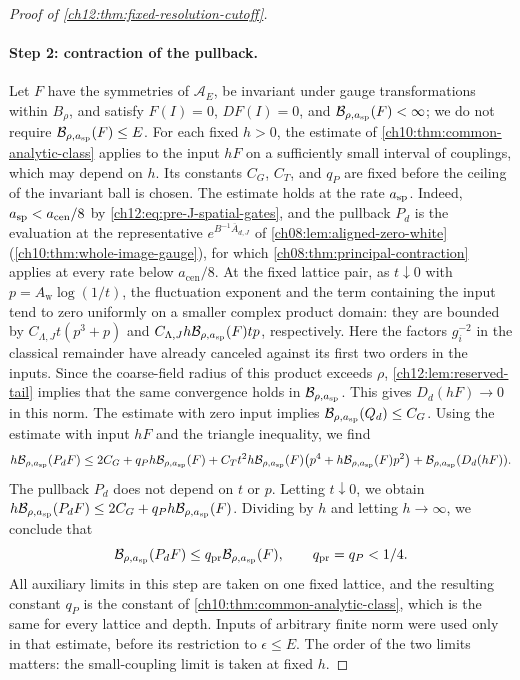 \begin{proof}[Proof of \cref{ch12:thm:fixed-resolution-cutoff}]
\paragraph{Step 2: contraction of the pullback.}
Let $F$ have the symmetries of $\mathcal A_E$, be invariant under gauge transformations within $B_\rho$, and satisfy $F(I)=0$, $DF(I)=0$, and $\mathcal B_{\rho,a_{\mathrm{sp}}}(F)<\infty$; we do not require $\mathcal B_{\rho,a_{\mathrm{sp}}}(F)\le E$. For each fixed $h>0$, the estimate of \cref{ch10:thm:common-analytic-class} applies to the input $hF$ on a sufficiently small interval of couplings, which may depend on $h$. Its constants $C_G$, $C_T$, and $q_P$ are fixed before the ceiling of the invariant ball is chosen. The estimate holds at the rate $a_{\mathrm{sp}}$. Indeed, $a_{\mathrm{sp}}<a_{\mathrm{cen}}/8$ by \eqref{ch12:eq:pre-J-spatial-gates}, and the pullback $P_d$ is the evaluation at the representative $e^{B^{-1}\overline A_{d,J}}$ of \cref{ch08:lem:aligned-zero-white} (\cref{ch10:thm:whole-image-gauge}), for which \cref{ch08:thm:principal-contraction} applies at every rate below $a_{\mathrm{cen}}/8$. At the fixed lattice pair, as $t\downarrow0$ with $p=A_{\mathrm w}\log(1/t)$, the fluctuation exponent and the term containing the input tend to zero uniformly on a smaller complex product domain: they are bounded by $C_{\Lambda,J}t(p^3+p)$ and $C_{\Lambda,J}h\mathcal B_{\rho,a_{\mathrm{sp}}}(F)tp$, respectively. Here the factors $g_i^{-2}$ in the classical remainder have already canceled against its first two orders in the inputs. Since the coarse-field radius of this product exceeds $\rho$, \cref{ch12:lem:reserved-tail} implies that the same convergence holds in $\mathcal B_{\rho,a_{\mathrm{sp}}}$. This gives $D_d(hF)\to0$ in this norm. The estimate with zero input implies $\mathcal B_{\rho,a_{\mathrm{sp}}}(Q_d)\le C_G$. Using the estimate with input $hF$ and the triangle inequality, we find
\[
 h\mathcal B_{\rho,a_{\mathrm{sp}}}(P_dF)\le2C_G+q_Ph\mathcal B_{\rho,a_{\mathrm{sp}}}(F)
 +C_Tt^2h\mathcal B_{\rho,a_{\mathrm{sp}}}(F)\bigl(p^4+h\mathcal B_{\rho,a_{\mathrm{sp}}}(F)p^2\bigr)+\mathcal B_{\rho,a_{\mathrm{sp}}}(D_d(hF)).
\]
The pullback $P_d$ does not depend on $t$ or $p$. Letting $t\downarrow0$, we obtain $h\mathcal B_{\rho,a_{\mathrm{sp}}}(P_dF)\le2C_G+q_Ph\mathcal B_{\rho,a_{\mathrm{sp}}}(F)$. Dividing by $h$ and letting $h\to\infty$, we conclude that
\begin{equation}
 \mathcal B_{\rho,a_{\mathrm{sp}}}(P_dF)\le q_{\mathrm{pr}}\mathcal B_{\rho,a_{\mathrm{sp}}}(F),\qquad q_{\mathrm{pr}}=q_P<1/4. \label{ch12:eq:principal}
\end{equation}
All auxiliary limits in this step are taken on one fixed lattice, and the resulting constant $q_P$ is the constant of \cref{ch10:thm:common-analytic-class}, which is the same for every lattice and depth. Inputs of arbitrary finite norm were used only in that estimate, before its restriction to $\epsilon\le E$. The order of the two limits matters: the small-coupling limit is taken at fixed $h$.


\end{proof}
